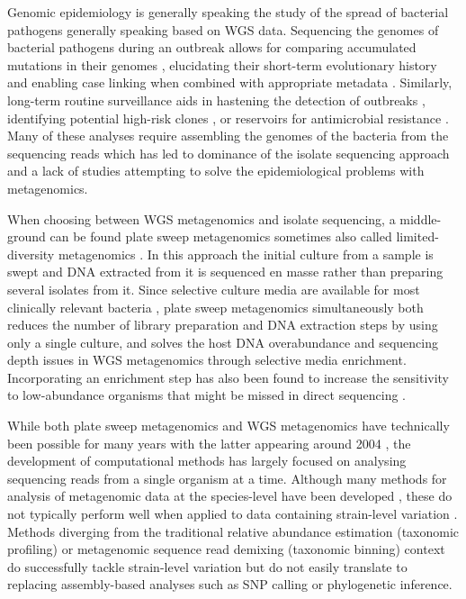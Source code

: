 \documentclass[officiallayout]{tktla}
\begin{document}
Genomic epidemiology is generally speaking the study of the spread of
bacterial pathogens generally speaking based on WGS data. Sequencing
the genomes of bacterial pathogens during an outbreak allows for
comparing accumulated mutations in their genomes
\citep{tang2017infection}, elucidating their short-term evolutionary
history and enabling case linking when combined with appropriate
metadata \citep{grad2014epidemiologic, hill2021progress}. Similarly,
long-term routine surveillance aids in hastening the detection of
outbreaks \citep{eyre2012pilot, gardy2018towards}, identifying
potential high-risk clones \citep{aanensen2016whole}, or reservoirs
for antimicrobial resistance \citep{weingarten2018genomic,
  coipan2020genomic}. Many of these analyses require assembling the
genomes of the bacteria from the sequencing reads which has led to
dominance of the isolate sequencing approach and a lack of studies
attempting to solve the epidemiological problems with metagenomics.

When choosing between WGS metagenomics and isolate sequencing, a
middle-ground can be found plate sweep metagenomics
\cite{maklin_high-resolution_2021} \textemdash{ } sometimes also
called limited-diversity metagenomics \citep{cocker_drivers_2022}. In
this approach the initial culture from a sample is swept and DNA
extracted from it is sequenced en masse rather than preparing several
isolates from it. Since selective culture media are available for most
clinically relevant bacteria \citep{lagier2015current}, plate sweep
metagenomics simultaneously both reduces the number of library
preparation and DNA extraction steps by using only a single culture,
and solves the host DNA overabundance and sequencing depth issues in
WGS metagenomics through selective media enrichment. Incorporating an
enrichment step has also been found to increase the sensitivity to
low-abundance organisms that might be missed in direct sequencing
\citep{whelan2020culture}.

While both plate sweep metagenomics and WGS metagenomics have
technically been possible for many years with the latter appearing
around 2004 \citep{tyson2004community, venter2004environmental}, the
development of computational methods has largely focused on analysing
sequencing reads from a single organism at a time. Although many
methods for analysis of metagenomic data at the species-level have
been developed \citep{breitwieser2019review}, these do not typically
perform well when applied to data containing strain-level variation
\citep{sczyrba2017critical}. Methods diverging from the traditional
relative abundance estimation (taxonomic profiling)
\citep{truong2017microbial} or metagenomic sequence read demixing
(taxonomic binning) \citep{van2022strainge} context do successfully
tackle strain-level variation but do not easily translate to replacing
assembly-based analyses such as SNP calling or phylogenetic inference.
\end{document}
